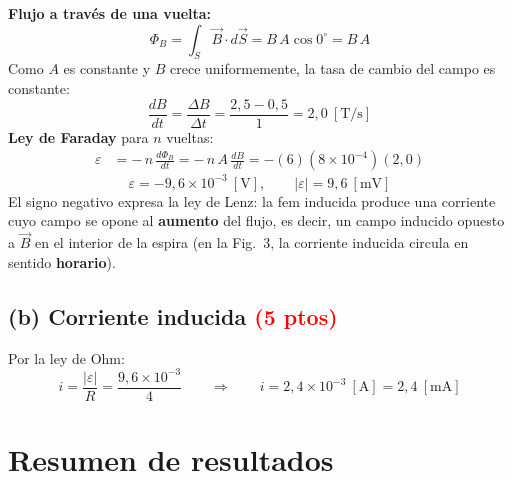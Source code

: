 \documentclass[12pt,letterpaper]{article}
\newcommand{\eps}{\varepsilon}
\newcommand{\ptos}[1]{\textcolor{red}{\textbf{(#1 ptos)}}}
\begin{document}
\noindent\textbf{Flujo a trav\'es de una vuelta:}
\[
    \Phi_B = \int_S\vec{B}\cdot d\vec{S} = B\,A\cos0^\circ = B\,A
\]
Como $A$ es constante y $B$ crece uniformemente, la tasa de cambio del campo es constante:
\[
    \frac{dB}{dt} = \frac{\Delta B}{\Delta t} = \frac{2{,}5 - 0{,}5}{1} = 2{,}0\ [\text{T/s}]
\]
\textbf{Ley de Faraday} para $n$ vueltas:
\begin{align*}
    \eps &= -\,n\,\frac{d\Phi_B}{dt} = -\,n\,A\,\frac{dB}{dt}
          = -(6)(8\times10^{-4})(2{,}0)
\end{align*}
\[
    \boxed{\eps = -9{,}6\times10^{-3}\ [\text{V}],\qquad |\eps| = 9{,}6\ [\text{mV}]}
\]
\noindent El signo negativo expresa la ley de Lenz: la fem inducida produce una corriente cuyo campo
se opone al \textbf{aumento} del flujo, es decir, un campo inducido opuesto a $\vec{B}$ en el interior
de la espira (en la Fig.\ 3, la corriente inducida circula en sentido \textbf{horario}).

\subsection*{(b) Corriente inducida \ptos{5}}

\noindent Por la ley de Ohm:
\[
    i = \frac{|\eps|}{R} = \frac{9{,}6\times10^{-3}}{4}
    \qquad\Longrightarrow\qquad
    \boxed{i = 2{,}4\times10^{-3}\ [\text{A}] = 2{,}4\ [\text{mA}]}
\]

\section*{Resumen de resultados}
\end{document}
